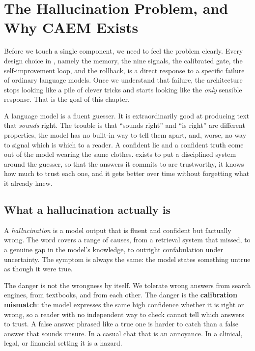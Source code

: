 \chapter{The Hallucination Problem, and Why \texorpdfstring{\textsc{CAEM}}{CAEM} Exists}
\label{ch:problem}

Before we touch a single component, we need to feel the problem clearly. Every
design choice in \caem{}, namely the memory, the nine signals, the calibrated
gate, the self-improvement loop, and the rollback, is a direct response to a
specific failure of ordinary language models. Once we understand that failure,
the architecture stops looking like a pile of clever tricks and starts looking
like the \emph{only} sensible response. That is the goal of this chapter.

\begin{intuition}
A language model is a fluent guesser. It is extraordinarily good at producing
text that \emph{sounds} right. The trouble is that ``sounds right'' and ``is
right'' are different properties, the model has no built-in way to tell them
apart, and, worse, no way to signal which is which to a reader. A confident lie
and a confident truth come out of the model wearing the same clothes. \caem{}
exists to put a disciplined system around the guesser, so that the answers it
commits to are trustworthy, it knows how much to trust each one, and it gets
better over time without forgetting what it already knew.
\end{intuition}

\section{What a hallucination actually is}

A \emph{hallucination} is a model output that is fluent and confident but
factually wrong. The word covers a range of causes, from a retrieval system
that missed, to a genuine gap in the model's knowledge, to outright
confabulation under uncertainty. The symptom is always the same: the model
states something untrue as though it were true.

The danger is not the wrongness by itself. We tolerate wrong answers from
search engines, from textbooks, and from each other. The danger is the
\textbf{calibration mismatch}: the model expresses the same high confidence
whether it is right or wrong, so a reader with no independent way to check
cannot tell which answers to trust. A false answer phrased like a true one is
harder to catch than a false answer that sounds unsure. In a casual chat that
is an annoyance. In a clinical, legal, or financial setting it is a hazard.

